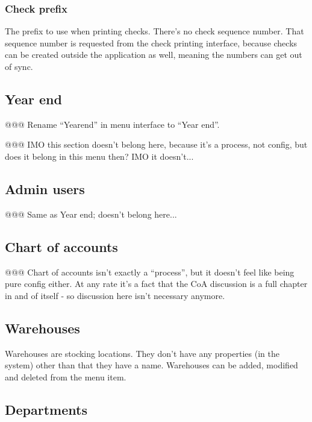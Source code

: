 \subsubsection{Check prefix}
\label{subsubsec-company-config-defaults-check-prefix}

 The prefix to use when printing checks. There's no check sequence number. That sequence number is requested from the check printing interface, because
checks can be created outside the application as well, meaning the numbers can
get out of sync.

\subsection{Year end}
\label{subsec-company-config-year-end}

@@@ Rename ``Yearend'' in menu interface to ``Year end''.


@@@ IMO this section doesn't belong here, because it's a process, not config, but does it belong in this menu then? IMO it doesn't...


\subsection{Admin users}
\label{subsec-company-config-admin-users}

@@@ Same as Year end; doesn't belong here...

\subsection{Chart of accounts}
\label{subsec-company-config-coa}

@@@ Chart of accounts isn't exactly a ``process'', but it doesn't feel like being pure
config either. At any rate it's a fact that the CoA discussion is a full chapter in and
of itself - so discussion here isn't necessary anymore.

\subsection{Warehouses}
\label{subsec-company-config-warehouses}

Warehouses are stocking locations. They don't have any properties (in the system)
other than that they have a name. Warehouses can be added, modified and deleted from
the  menu item.

\subsection{Departments}
\label{subsec-company-config-departments}

